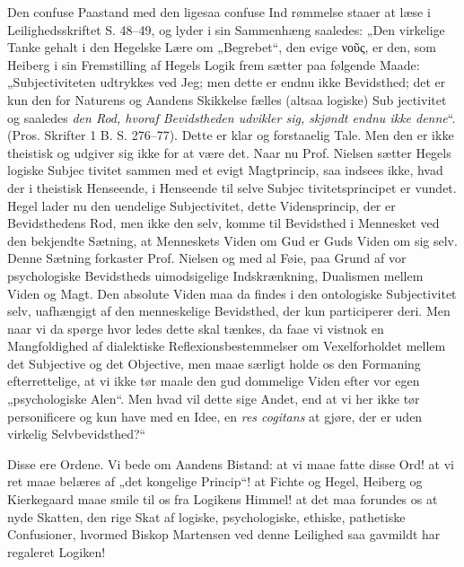 \documentclass[12pt]{book}
\newcommand{\opage}[1]{\marginnote{\footnotesize\textit{[#1]}}}
\begin{document}
Den confuse Paastand med den ligesaa confuse Ind\-%
rømmelse staaer at læse i Leilighedsskriftet S. 48--49, og
lyder i sin Sammenhæng saaledes: „Den virkelige Tanke\-%
gehalt i den Hegelske Lære om „Begrebet“, den evige νοῦς,
er den, som Heiberg i sin Fremstilling af Hegels Logik frem\-%
sætter paa følgende Maade: „Subjectiviteten udtrykkes ved
Jeg; men dette er endnu ikke Bevidsthed; det er kun den for
Naturens og Aandens Skikkelse fælles (altsaa logiske) Sub\-%
jectivitet og saaledes \emph{den Rod, hvoraf Bevidstheden
udvikler sig, skjøndt endnu ikke denne}“. (Pros.
Skrifter 1 B. S. 276--77). Dette er klar og forstaaelig
Tale. Men den er ikke theistisk og udgiver sig ikke for at være
det. Naar nu Prof. Nielsen sætter Hegels logiske Subjec\-%
tivitet sammen med et evigt Magtprincip, saa indsees ikke,
hvad der i theistisk Henseende, i Henseende til selve Subjec\-%
tivitetsprincipet er vundet. Hegel lader nu den uendelige
Subjectivitet, dette Vidensprincip, der er Bevidsthedens Rod,
men ikke den selv, komme til Bevidsthed i Mennesket ved den
bekjendte Sætning, at Menneskets Viden om Gud er Guds
Viden om sig selv. Denne Sætning forkaster Prof. Nielsen
og med al Føie, paa Grund af vor psychologiske Bevidstheds
uimodsigelige Indskrænkning, Dualismen mellem Viden og
Magt. Den absolute Viden maa da findes i den ontologiske
Subjectivitet selv, uafhængigt af den menneskelige Bevidsthed,
der kun participerer deri. Men naar vi da spørge hvor\-%
ledes dette skal tænkes, da faae vi vistnok en Mangfoldighed
af dialektiske Reflexionsbestemmelser om Vexelforholdet mellem
det Subjective og det Objective, men maae særligt holde os
den Formaning efterrettelige, at vi ikke tør maale den gud\-%
dommelige Viden efter vor egen „psychologiske Alen“. Men
hvad vil dette sige Andet, end at vi her ikke tør personificere
\opage{121}\setcounter{footnote}{0}%
og kun have med en Idee, en \textit{res cogitans} at gjøre, der er
uden virkelig Selvbevidsthed?“

Disse ere Ordene. Vi bede om Aandens Bistand: at vi
maae fatte disse Ord! at vi ret maae belæres af „det kongelige
Princip“! at Fichte og Hegel, Heiberg og Kierkegaard maae
smile til os fra Logikens Himmel! at det maa forundes os
at nyde Skatten, den rige Skat af logiske, psychologiske,
ethiske, pathetiske Confusioner, hvormed Biskop Martensen
ved denne Leilighed saa gavmildt har regaleret Logiken!
\end{document}
